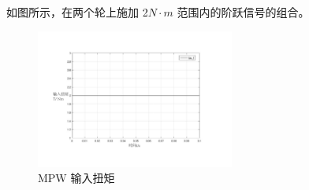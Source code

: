 \begin{itemize}
	如图所示，在两个轮上施加 2$ N \cdot m $ 范围内的阶跃信号的组合。
	\begin{figure}[!h]
		\centering
		\includegraphics[width=0.58\textwidth]{fig/simulation/MPW_tauL.pdf}
		\caption{MPW 输入扭矩}\label{MPW_tauL}
	\end{figure}
	

\end{itemize}
